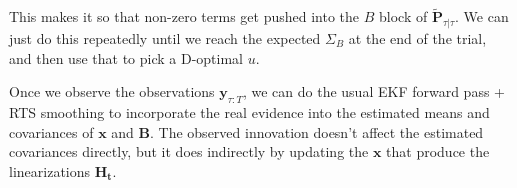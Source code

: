 \documentclass[11pt,letterpaper]{article} %
\begin{document}
This makes it so that non-zero terms get pushed into the $B$ block of $\widetilde{\bm{P}}_{\tau|\tau}.$ We can just do this repeatedly until we reach the expected $\Sigma_B$ at the end of the trial, and then use that to pick a D-optimal $u$.

Once we observe the observations $\bm{y}_{\tau:T}$, we can do the usual EKF forward pass + RTS smoothing to incorporate the real evidence into the estimated means and covariances of $\bm{x}$ and $\bm{B}$. The observed innovation doesn't affect the estimated covariances directly, but it does indirectly by updating the $\bm{x}$ that produce the linearizations $\bm{H_t}$.
\end{document}
